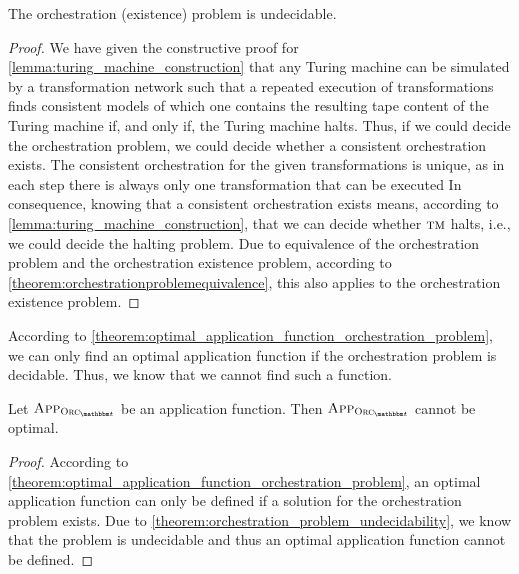 \begin{theorem} \label{theorem:orchestration_problem_undecidability}
    The orchestration (existence) problem is undecidable.
\end{theorem}
\begin{proof}
    We have given the constructive proof for \autoref{lemma:turing_machine_construction} that any Turing machine can be simulated by a transformation network such that a repeated execution of transformations finds consistent models of which one contains the resulting tape content of the Turing machine if, and only if, the Turing machine halts.
    Thus, if we could decide the orchestration problem, we could decide whether a consistent orchestration exists. 
    The consistent orchestration for the given transformations is unique, as in each step there is always only one transformation that can be executed
    In consequence, knowing that a consistent orchestration exists means, according to \autoref{lemma:turing_machine_construction}, that we can decide whether $\textsc{tm}$ halts, i.e., we could decide the halting problem.
    Due to equivalence of the orchestration problem and the orchestration existence problem, according to \autoref{theorem:orchestrationproblemequivalence}, this also applies to the orchestration existence problem.
\end{proof}

According to \autoref{theorem:optimal_application_function_orchestration_problem}, we can only find an optimal application function if the orchestration problem is decidable.
Thus, we know that we cannot find such a function.

\begin{corollary}
    \label{corollary:nooptimalapplication}
    Let $\appfunction{\orcfunction{\transformationset{T}}}$ be an application function. Then $\appfunction{\orcfunction{\transformationset{T}}}$ cannot be optimal.
\end{corollary}
\begin{proof}
    According to \autoref{theorem:optimal_application_function_orchestration_problem}, an optimal application function can only be defined if a solution for the orchestration problem exists.
    Due to \autoref{theorem:orchestration_problem_undecidability}, we know that the problem is undecidable and thus an optimal application function cannot be defined.
\end{proof}

